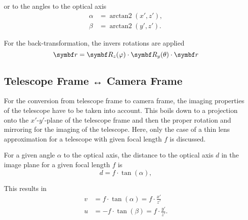 \documentclass[DIV=15]{scrartcl}
\newcommand\azimuth{\ensuremath{\varphi}}
\newcommand\zenith{\ensuremath{\theta}}
\begin{document}
or to the angles to the optical axis
\begin{align}
  \alpha &= \operatorname{arctan2}(x', z'), \\
  \beta &= \operatorname{arctan2}(y', z').
\end{align}

For the back-transformation, the invers rotations are applied
\begin{equation}
  \v{r} = \mat{R}_z(\azimuth) \cdot \mat{R}_y(\zenith) \cdot \v{r}
\end{equation}




\subsection{Telescope Frame ↔ Camera Frame}

For the conversion from telescope frame to camera frame, the imaging properties of the telescope have to be taken into account.
This boils down to a projection onto the $x'$-$y'$-plane of the telescope frame and then the proper rotation and mirroring for the imaging of the telescope.
Here, only the case of a thin lens approximation for a telescope with given focal length $f$ is discussed.

For a given angle $\alpha$ to the optical axis, the distance to the optical axis $d$ in the image plane for a given focal length $f$ is
\begin{equation}
  d = f \cdot \tan(\alpha),
\end{equation}

This results in
\begin{align}
  v &= f \cdot \tan(\alpha) = f \cdot \frac{x'}{z'} \\
  u &= -f \cdot \tan(\beta) = f \cdot \frac{y'}{z'}.
\end{align}


\printbibliography
\end{document}

